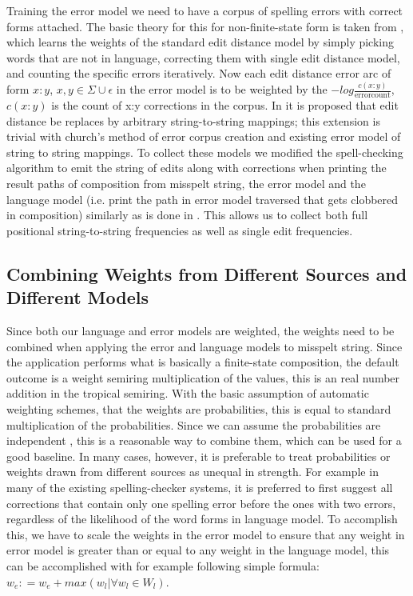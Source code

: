 \documentclass[a4paper,12pt]{article}
\begin{document}
Training the error model we need to have a corpus of spelling errors with
correct forms attached. The basic theory for this for non-finite-state form is
taken from \cite{church1991probability}, which learns the weights of the standard edit
distance model by simply picking words that are not in language, correcting
them with single edit distance model, and counting the specific errors
iteratively. Now each edit distance error arc of form $x:y$, $x, y \in \Sigma
\cup {\epsilon}$ in the error model is to be weighted by the $-log
\frac{c(x:y)}{\mathrm{error count}}$, $c(x:y)$ is the count of x:y corrections
in the corpus. In \cite{brill2000improved} it is proposed that edit distance be
replaces by arbitrary string-to-string mappings; this extension is trivial with
church's method of error corpus creation and existing error model of string to
string mappings. To collect these models we modified the spell-checking
algorithm to emit the string of edits along with corrections when printing the
result paths of composition from misspelt string, the error model and the
language model (i.e. print the path in error model traversed that gets
clobbered in composition) similarly as is done in \cite{ristad1998learning}.
This allows us to collect both full positional string-to-string frequencies as
well as single edit frequencies. 

\subsection{Combining Weights from Different Sources and Different Models}
\label{subsec:combining-weights}

Since both our language and error models are weighted, the weights need to be
combined when applying the error and language models to misspelt string. Since
the application performs what is basically a finite-state composition, the
default outcome is a weight semiring multiplication of the values, this is an
real number addition in the tropical semiring. With the basic assumption of
automatic weighting schemes, that the weights are probabilities, this is equal
to standard multiplication of the probabilities. Since we can assume the
probabilities are independent \cite{church1991probability}, this is a
reasonable way to combine them, which can be used for a good baseline. In many
cases, however, it is preferable to treat probabilities or weights drawn from
different sources as unequal in strength. For example in many of the existing
spelling-checker systems, it is preferred to first suggest all corrections that
contain only one spelling error before the ones with two errors, regardless of
the likelihood of the word forms in language model. To accomplish this, we have
to scale the weights in the error model to ensure that any weight in error
model is greater than or equal to any weight in the language model, this can be
accomplished with for example following simple formula: $w_e
\mathrel{\mathop:}= w_e + max(w_l | \forall w_l \in W_l)$.
\end{document}
